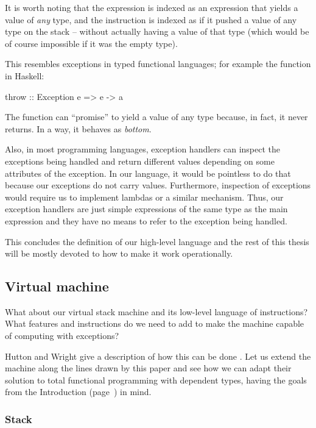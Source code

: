 It is worth noting that the expression  is indexed as an expression
that yields a value of \emph{any} type, and the instruction  is indexed
as if it pushed a value of any type on the stack -- without actually having a value
of that type (which would be of course impossible if it was the empty type).

This resembles exceptions in typed functional languages; for example the function
 in Haskell:
\begin{code}
  throw :: Exception e => e -> a
\end{code}
The function  can ``promise'' to yield a value of any type because,
in fact, it never returns. In a way, it behaves as \emph{bottom}.

Also, in most programming languages, exception handlers can inspect the
exceptions being handled and return different values depending on some
attributes of the exception. In our language, it would be pointless to do that
because our exceptions do not carry values.  Furthermore, inspection of
exceptions would require us to implement lambdas or a similar mechanism.  Thus,
our exception handlers are just simple expressions of the same type as the main
expression and they have no means to refer to the exception being handled.

This concludes the definition of our high-level language and the rest of this thesis
will be mostly devoted to how to make it work operationally.

\subsection{Virtual machine}
\label{sec:own-execution-gmh}

What about our virtual stack machine and its low-level language of
instructions? What features and instructions do we need to add to make the
machine capable of computing with exceptions?

Hutton and Wright give a description of how this can be done \cite{gmh:exceptions}.
Let us extend the machine along the lines drawn by this paper and see
how we can adapt their solution to total functional programming with dependent
types, having the goals from the Introduction (page~\pageref{objectives}) in
mind.

\subsubsection{Stack}

